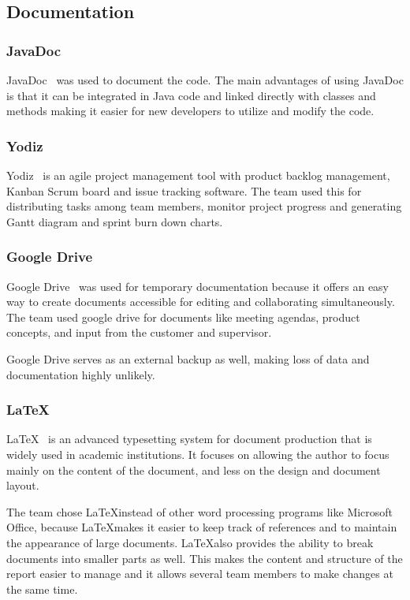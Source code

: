 \subsection{Documentation}

\subsubsection{JavaDoc}
JavaDoc~\cite{javadoc} was used to document the code. The main advantages of using JavaDoc is that it can be integrated in Java code and linked directly with classes and methods making it easier for new developers to utilize and modify the code.

\subsubsection{Yodiz}
Yodiz~\cite{yodiz} is an agile project management tool with product backlog management, Kanban Scrum board and issue tracking software. The team used this for distributing tasks among team members, monitor project progress and generating Gantt diagram and sprint burn down charts.

\subsubsection{Google Drive}
Google Drive~\cite{gdrive} was used for temporary documentation because it offers an easy way to create documents accessible for editing and collaborating simultaneously. The team used google drive for documents like meeting agendas, product concepts, and input from the customer and supervisor. 

Google Drive serves as an external backup as well, making loss of data and documentation highly unlikely.

\subsubsection{\LaTeX}
LaTeX~\cite{latex} is an advanced typesetting system for document production that is widely used in
academic institutions. It focuses on allowing the author to focus mainly on the content of the document, and less on the design and document layout.

The team chose \LaTeX instead of other word processing programs like Microsoft Office, because \LaTeX makes it easier to keep track of references and to maintain the appearance of large documents. 
\LaTeX also provides the ability to break documents into smaller parts as well. This makes the content and structure of the report easier to manage and it allows several team members to make changes at the same time.


